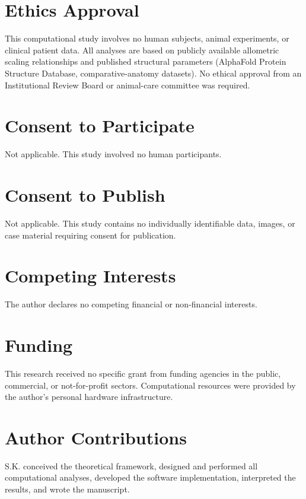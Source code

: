 \section*{Ethics Approval}

This computational study involves no human subjects, animal experiments, or clinical patient data. All analyses are based on publicly available allometric scaling relationships and published structural parameters (AlphaFold Protein Structure Database, comparative-anatomy datasets). No ethical approval from an Institutional Review Board or animal-care committee was required.

\section*{Consent to Participate}

Not applicable. This study involved no human participants.

\section*{Consent to Publish}

Not applicable. This study contains no individually identifiable data, images, or case material requiring consent for publication.

\section*{Competing Interests}

The author declares no competing financial or non-financial interests.

\section*{Funding}

This research received no specific grant from funding agencies in the public, commercial, or not-for-profit sectors. Computational resources were provided by the author's personal hardware infrastructure.

\section*{Author Contributions}

S.K. conceived the theoretical framework, designed and performed all computational analyses, developed the software implementation, interpreted the results, and wrote the manuscript.
